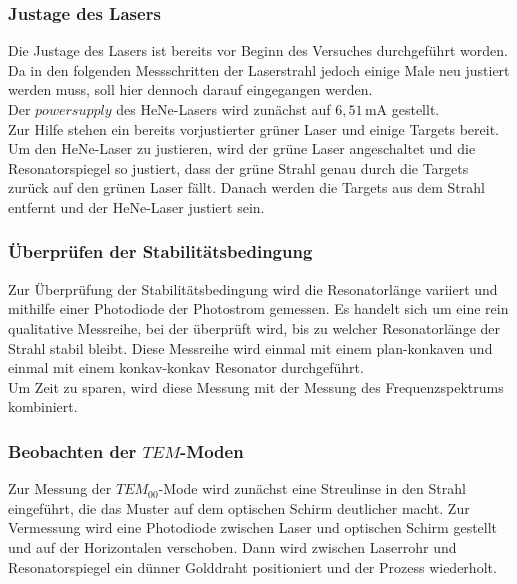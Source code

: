 \subsubsection{Justage des Lasers}

Die Justage des Lasers ist bereits vor Beginn des Versuches durchgeführt worden.
Da in den folgenden Messschritten der Laserstrahl jedoch einige Male neu justiert werden muss, soll hier dennoch darauf eingegangen werden. \\

Der $power supply$ des HeNe-Lasers wird zunächst auf $6,51 \,\unit{\milli\ampere}$ gestellt. \\ %
Zur Hilfe stehen ein bereits vorjustierter grüner Laser und einige Targets bereit.
Um den HeNe-Laser zu justieren, wird der grüne Laser angeschaltet und die Resonatorspiegel so justiert, dass der grüne Strahl genau durch die Targets zurück auf den grünen Laser fällt.
Danach werden die Targets aus dem Strahl entfernt und der HeNe-Laser justiert sein.

\subsubsection{Überprüfen der Stabilitätsbedingung}

Zur Überprüfung der Stabilitätsbedingung wird die Resonatorlänge variiert und mithilfe einer Photodiode der Photostrom gemessen. Es handelt sich um eine rein qualitative Messreihe, bei der überprüft wird,
bis zu welcher Resonatorlänge der Strahl stabil bleibt. 
Diese Messreihe wird einmal mit einem plan-konkaven und einmal mit einem konkav-konkav Resonator durchgeführt. \\

Um Zeit zu sparen, wird diese Messung mit der Messung des Frequenzspektrums kombiniert.


\subsubsection{Beobachten der $TEM$-Moden}

Zur Messung der $TEM_{00}$-Mode wird zunächst eine Streulinse in den Strahl eingeführt, die das Muster auf dem optischen Schirm deutlicher macht.
Zur Vermessung wird eine Photodiode zwischen Laser und optischen Schirm gestellt und auf der Horizontalen verschoben.
Dann wird zwischen Laserrohr und Resonatorspiegel ein dünner Golddraht positioniert und der Prozess wiederholt.



